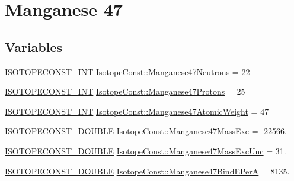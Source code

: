 \hypertarget{group___isotope_const-_manganese-_mn47}{}\section{Manganese 47}
\label{group___isotope_const-_manganese-_mn47}
\subsection*{Variables}
\begin{DoxyCompactItemize}
\item 
\mbox{\hyperlink{group___isotope_const-_macros_ga5f18360b3e99483a35c32d789e62621c}{I\+S\+O\+T\+O\+P\+E\+C\+O\+N\+S\+T\+\_\+\+I\+NT}} \mbox{\hyperlink{group___isotope_const-_manganese-_mn47_ga4d869ec4692dcddde79ece8f03700d27}{Isotope\+Const\+::\+Manganese47\+Neutrons}} = 22
\item 
\mbox{\hyperlink{group___isotope_const-_macros_ga5f18360b3e99483a35c32d789e62621c}{I\+S\+O\+T\+O\+P\+E\+C\+O\+N\+S\+T\+\_\+\+I\+NT}} \mbox{\hyperlink{group___isotope_const-_manganese-_mn47_gacc11718818410a64813ac7226ee6f63a}{Isotope\+Const\+::\+Manganese47\+Protons}} = 25
\item 
\mbox{\hyperlink{group___isotope_const-_macros_ga5f18360b3e99483a35c32d789e62621c}{I\+S\+O\+T\+O\+P\+E\+C\+O\+N\+S\+T\+\_\+\+I\+NT}} \mbox{\hyperlink{group___isotope_const-_manganese-_mn47_ga741a8cfcdaf9ab27822b397b9abb3ef5}{Isotope\+Const\+::\+Manganese47\+Atomic\+Weight}} = 47
\item 
\mbox{\hyperlink{group___isotope_const-_macros_ga8f45a7272ce02c0b4c65c44636ed719a}{I\+S\+O\+T\+O\+P\+E\+C\+O\+N\+S\+T\+\_\+\+D\+O\+U\+B\+LE}} \mbox{\hyperlink{group___isotope_const-_manganese-_mn47_gac756abd03d41fbce77860a550819a2ba}{Isotope\+Const\+::\+Manganese47\+Mass\+Exc}} = -\/22566.
\item 
\mbox{\hyperlink{group___isotope_const-_macros_ga8f45a7272ce02c0b4c65c44636ed719a}{I\+S\+O\+T\+O\+P\+E\+C\+O\+N\+S\+T\+\_\+\+D\+O\+U\+B\+LE}} \mbox{\hyperlink{group___isotope_const-_manganese-_mn47_gaf9781b40bda1f1010dbdb3a9c39e22a7}{Isotope\+Const\+::\+Manganese47\+Mass\+Exc\+Unc}} = 31.
\item 
\mbox{\hyperlink{group___isotope_const-_macros_ga8f45a7272ce02c0b4c65c44636ed719a}{I\+S\+O\+T\+O\+P\+E\+C\+O\+N\+S\+T\+\_\+\+D\+O\+U\+B\+LE}} \mbox{\hyperlink{group___isotope_const-_manganese-_mn47_ga18c318fc1da694136e99bc7be08f192c}{Isotope\+Const\+::\+Manganese47\+Bind\+E\+PerA}} = 8135.
\item 

\end{DoxyCompactItemize}
